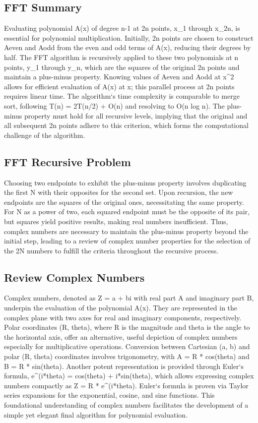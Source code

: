 \subsection*{FFT  Summary}
Evaluating polynomial A(x) of degree n-1 at 2n points, x\_1 through x\_2n, is essential for polynomial multiplication.
Initially, 2n points are chosen to construct Aeven and Aodd from the even and odd terms of A(x), reducing their degrees by half.
The FFT algorithm is recursively applied to these two polynomials at n points, y\_1 through y\_n, which are the squares of the original 2n points and maintain a plus-minus property.
Knowing values of Aeven and Aodd at x\textasciicircum{}2 allows for efficient evaluation of A(x) at x; this parallel process at 2n points requires linear time.
The algorithm`s time complexity is comparable to merge sort, following T(n) = 2T(n/2) + O(n) and resolving to O(n log n).
The plus-minus property must hold for all recursive levels, implying that the original and all subsequent 2n points adhere to this criterion, which forms the computational challenge of the algorithm.

\subsection*{FFT  Recursive Problem}
Choosing two endpoints to exhibit the plus-minus property involves duplicating the first N with their opposites for the second set.
Upon recursion, the new endpoints are the squares of the original ones, necessitating the same property.
For N as a power of two, each squared endpoint must be the opposite of its pair, but squares yield positive results, making real numbers insufficient.
Thus, complex numbers are necessary to maintain the plus-minus property beyond the initial step, leading to a review of complex number properties for the selection of the 2N numbers to fulfill the criteria throughout the recursive process.

\subsection*{Review  Complex Numbers}
Complex numbers, denoted as Z = a + bi with real part A and imaginary part B, underpin the evaluation of the polynomial A(x).
They are represented in the complex plane with two axes for real and imaginary components, respectively.
Polar coordinates (R, theta), where R is the magnitude and theta is the angle to the horizontal axis, offer an alternative, useful depiction of complex numbers especially for multiplicative operations.
Conversion between Cartesian (a, b) and polar (R, theta) coordinates involves trigonometry, with A = R * cos(theta) and B = R * sin(theta).
Another potent representation is provided through Euler`s formula, e\textasciicircum{}(i*theta) = cos(theta) + i*sin(theta), which allows expressing complex numbers compactly as Z = R * e\textasciicircum{}(i*theta).
Euler`s formula is proven via Taylor series expansions for the exponential, cosine, and sine functions.
This foundational understanding of complex numbers facilitates the development of a simple yet elegant final algorithm for polynomial evaluation.

